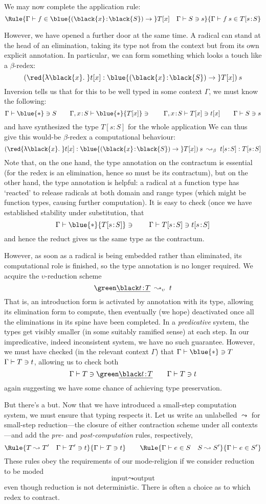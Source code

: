 \documentclass[natbib]{article}
\newcommand{\type}{\blue{\ast}}
\newcommand{\hb}{\!:\!}
\newcommand{\PI}[2]{\blue{(\black{#1}\hb \black{#2})\to\;}}
\newcommand{\LA}[1]{\red{\uplambda\black{#1}.\;}}
\begin{document}
We may now complete the application rule:
\[
\Rule{\SYN\Gamma f {\PI xS T[x]} \quad \CHK\Gamma Ss}
     {\SYN\Gamma{f\:s}{T[s\hb S}}
\]

However, we have opened a further door at the same time. A radical can stand at the head of an elimination, taking its type not from the context but from its own explicit annotation. In particular, we can form something which looks a touch like a $\beta$-redex:
\[
(\LA xt[x] : \PI xS T[x])\:s
\]
Inversion tells us that for this to be well typed in some context $\Gamma$, we must know the following:
\[
\CHK\Gamma\type S \qquad
\CHK{\Gamma,x\hb S}\type{T[x]} \qquad
\CHK{\Gamma,x\hb S}{T[x]}{t[x]} \qquad
\CHK\Gamma Ss
\]
and have synthesized the type $T[s\hb S]$ for the whole application
We can thus give this would-be $\beta$-redex a computational behaviour:
\[
(\LA xt[x] : \PI xS T[x])\:s \;\leadsto_\beta\; t[s\hb S]:T[s\hb S]
\]
Note that, on the one hand, the type annotation on the contractum is essential (for the redex is an elimination, hence so must be its contractum), but on the other hand, the type annotation is helpful: a radical at a function type has `reacted' to release radicals at both domain and range types (which might be function types, causing further computation). It is easy to check (once we have established stability under substitution, that
\[
\CHK\Gamma\type{T[s\hb S]} \qquad
\CHK\Gamma{T[s\hb S]}{t[s\hb S]}
\]
and hence the reduct gives us the same type as the contractum.

However, as soon as a radical is being embedded rather than eliminated, its computational role is finished, so the type annotation is no longer required. We acquire the $\upsilon$-reduction scheme
\[
\el{t\hb T} \;\leadsto_\upsilon\; t
\]
That is, an introduction form is activated by annotation with its type, allowing its elimination form to compute, then eventually (we hope) deactivated once all the eliminations in its spine have been completed. In a \emph{predicative} system, the types get visibly smaller (in some suitably ramified sense) at each step. In our impredicative, indeed inconsistent system, we have no such guarantee. However, we must have checked (in the relevant context $\Gamma$) that $\CHK\Gamma\type T$ $\Gamma \vdash T \ni t$, allowing us to check both
\[
\CHK\Gamma T{\el{t\hb T}} \qquad \CHK\Gamma Tt
\]
again suggesting we have some chance of achieving type preservation.

But there's a but. Now that we have introduced a small-step computation system, we must ensure that typing respects it. Let us write an unlabelled $\leadsto$ for small-step reduction---the closure of either contraction scheme under all contexts---and add the \emph{pre-} and \emph{post-computation} rules, respectively,
\[
\Rule{T\leadsto T'\quad \CHK\Gamma{T'}t}
     {\CHK\Gamma Tt}
\qquad
\Rule{\SYN\Gamma eS \quad S\leadsto S'}
     {\SYN\Gamma e{S'}}
\]
These rules obey the requirements of our mode-religion if we consider reduction to be moded
\[
\mbox{input}\leadsto\mbox{output}
\]
even though reduction is not deterministic. There is often a choice as to which redex to contract.
\end{document}
